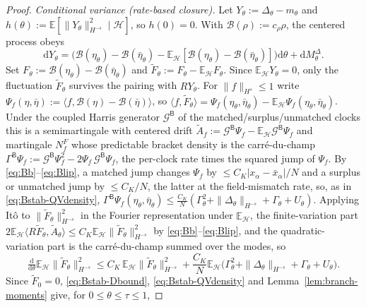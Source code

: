 \documentclass[a4paper,fleqn]{cas-sc}
\theoremstyle{definition}
\theoremstyle{remark}
\begin{document}
\begin{proof}
\emph{Conditional variance (rate-based closure).} Let $Y_\theta:=\Delta_\theta-m_\theta$ and
$h(\theta):=\mathbb E[\|Y_\theta\|_{H^{-s}}^2\mid\mathcal H]$, so $h(0)=0$. With
$\mathcal B(\rho):=c_\rho\rho$, the centered process obeys
\[
\mathrm dY_\theta=\bigl(\mathcal B(\eta_\theta)-\mathcal B(\bar\eta_\theta)
-\mathbb E_{\mathcal H}[\mathcal B(\eta_\theta)-\mathcal B(\bar\eta_\theta)]\bigr)\mathrm d\theta
+\mathrm dM^\Delta_\theta .
\]
Set $F_\theta:=\mathcal B(\eta_\theta)-\mathcal B(\bar\eta_\theta)$ and
$\widetilde F_\theta:=F_\theta-\mathbb E_{\mathcal H}F_\theta$. Since $\mathbb E_{\mathcal H}Y_\theta=0$,
only the fluctuation $\widetilde F_\theta$ survives the pairing with $RY_\theta$. For $\|f\|_{H^s}\le1$ write $\Psi_f(\eta,\bar\eta):=\langle f,\mathcal B(\eta)-\mathcal B(\bar\eta)\rangle$,
so $\langle f,\widetilde F_\theta\rangle=\Psi_f(\eta_\theta,\bar\eta_\theta)-\mathbb E_{\mathcal H}\Psi_f(\eta_\theta,\bar\eta_\theta)$.
Under the coupled Harris generator $\mathcal G^{\mathsf B}$ of the matched/surplus/unmatched clocks this is a
semimartingale with centered drift $\widetilde A_f:=\mathcal G^{\mathsf B}\Psi_f-\mathbb E_{\mathcal H}\mathcal G^{\mathsf B}\Psi_f$
and martingale $N^F_f$ whose predictable bracket density is the carré-du-champ
$\Gamma^{\mathsf B}\Psi_f:=\mathcal G^{\mathsf B}\Psi_f^2-2\Psi_f\,\mathcal G^{\mathsf B}\Psi_f$, the per-clock rate
times the squared jump of $\Psi_f$. By \eqref{eq:Bb}--\eqref{eq:Blip}, a matched jump changes $\Psi_f$ by
$\le C_K|x_\alpha-\bar x_\alpha|/N$ and a surplus or unmatched jump by $\le C_K/N$, the latter at the
field-mismatch rate, so, as in \eqref{eq:Bstab-QVdensity},
$\Gamma^{\mathsf B}\Psi_f(\eta_\theta,\bar\eta_\theta)\le\frac{C_K}N(\Gamma_\theta^2+\|\Delta_\theta\|_{H^{-s}}+\Gamma_\theta+U_\theta)$.
Applying It\^o to $\|\widetilde F_\theta\|_{H^{-s}}^2$ in the Fourier representation under
$\mathbb E_{\mathcal H}$, the finite-variation part $2\mathbb E_{\mathcal H}\langle R\widetilde F_\theta,\widetilde A_\theta\rangle\le C_K\mathbb E_{\mathcal H}\|\widetilde F_\theta\|_{H^{-s}}^2$
by \eqref{eq:Bb}--\eqref{eq:Blip}, and the quadratic-variation part is the carré-du-champ summed over
the modes, so
\[
\tfrac{\mathrm d}{\mathrm d\theta}\mathbb E_{\mathcal H}\|\widetilde F_\theta\|_{H^{-s}}^2
\le C_K\,\mathbb E_{\mathcal H}\|\widetilde F_\theta\|_{H^{-s}}^2
+\frac{C_K}N\mathbb E_{\mathcal H}\bigl(\Gamma_\theta^2+\|\Delta_\theta\|_{H^{-s}}+\Gamma_\theta+U_\theta\bigr).
\]
Since $\widetilde F_0=0$, \eqref{eq:Bstab-Dbound}, \eqref{eq:Bstab-QVdensity} and
Lemma~\ref{lem:branch-moments} give, for $0\le\theta\le\tau\le1$,

\end{proof}
\end{document}
